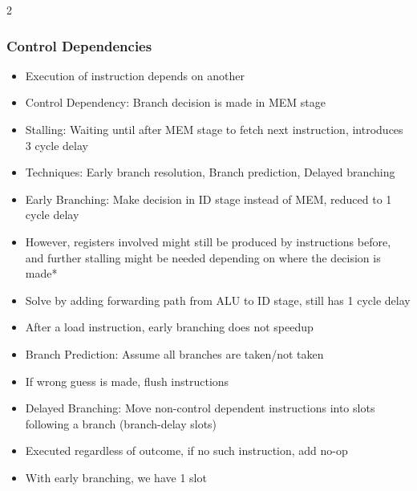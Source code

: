 \documentclass[10pt, portrait]{article}
\begin{document}
\begin{multicols*}{2}
\subsubsection{Control Dependencies}
\begin{itemize}
    \item Execution of instruction depends on another
     \item Control Dependency: Branch decision is made in MEM stage
    \item Stalling: Waiting until after MEM stage to fetch next instruction, introduces 3 cycle delay
    \item Techniques: Early branch resolution, Branch prediction, Delayed branching
    \item Early Branching: Make decision in ID stage instead of MEM, reduced to 1 cycle delay
    \item However, registers involved might still be produced by instructions before, and further stalling might be needed depending on where the decision is made*
    \item Solve by adding forwarding path from ALU to ID stage, still has 1 cycle delay
    \item After a load instruction, early branching does not speedup
    \item Branch Prediction: Assume all branches are taken/not taken
    \item If wrong guess is made, flush instructions
    \item Delayed Branching: Move non-control dependent instructions into slots following a branch (branch-delay slots)
    \item Executed regardless of outcome, if no such instruction, add no-op
    \item With early branching, we have 1 slot
\end{itemize}


\end{multicols*}
\end{document}

